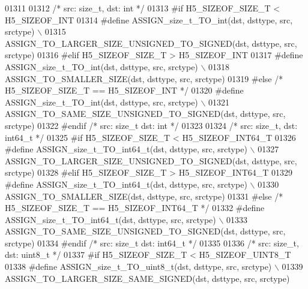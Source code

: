 \begin{DoxyCode}
01311 
01312 \textcolor{comment}{/* src: size\_t, dst: int */}
01313 \textcolor{preprocessor}{#if H5\_SIZEOF\_SIZE\_T < H5\_SIZEOF\_INT}
01314 \textcolor{preprocessor}{    #define ASSIGN\_size\_t\_TO\_int(dst, dsttype, src, srctype) \(\backslash\)}
01315 \textcolor{preprocessor}{        ASSIGN\_TO\_LARGER\_SIZE\_UNSIGNED\_TO\_SIGNED(dst, dsttype, src, srctype)}
01316 \textcolor{preprocessor}{#elif H5\_SIZEOF\_SIZE\_T > H5\_SIZEOF\_INT}
01317 \textcolor{preprocessor}{    #define ASSIGN\_size\_t\_TO\_int(dst, dsttype, src, srctype) \(\backslash\)}
01318 \textcolor{preprocessor}{        ASSIGN\_TO\_SMALLER\_SIZE(dst, dsttype, src, srctype)}
01319 \textcolor{preprocessor}{#else }\textcolor{comment}{/* H5\_SIZEOF\_SIZE\_T == H5\_SIZEOF\_INT */}\textcolor{preprocessor}{}
01320 \textcolor{preprocessor}{    #define ASSIGN\_size\_t\_TO\_int(dst, dsttype, src, srctype) \(\backslash\)}
01321 \textcolor{preprocessor}{        ASSIGN\_TO\_SAME\_SIZE\_UNSIGNED\_TO\_SIGNED(dst, dsttype, src, srctype)}
01322 \textcolor{preprocessor}{#endif }\textcolor{comment}{/* src: size\_t dst: int */}\textcolor{preprocessor}{}
01323 
01324 \textcolor{comment}{/* src: size\_t, dst: int64\_t */}
01325 \textcolor{preprocessor}{#if H5\_SIZEOF\_SIZE\_T < H5\_SIZEOF\_INT64\_T}
01326 \textcolor{preprocessor}{    #define ASSIGN\_size\_t\_TO\_int64\_t(dst, dsttype, src, srctype) \(\backslash\)}
01327 \textcolor{preprocessor}{        ASSIGN\_TO\_LARGER\_SIZE\_UNSIGNED\_TO\_SIGNED(dst, dsttype, src, srctype)}
01328 \textcolor{preprocessor}{#elif H5\_SIZEOF\_SIZE\_T > H5\_SIZEOF\_INT64\_T}
01329 \textcolor{preprocessor}{    #define ASSIGN\_size\_t\_TO\_int64\_t(dst, dsttype, src, srctype) \(\backslash\)}
01330 \textcolor{preprocessor}{        ASSIGN\_TO\_SMALLER\_SIZE(dst, dsttype, src, srctype)}
01331 \textcolor{preprocessor}{#else }\textcolor{comment}{/* H5\_SIZEOF\_SIZE\_T == H5\_SIZEOF\_INT64\_T */}\textcolor{preprocessor}{}
01332 \textcolor{preprocessor}{    #define ASSIGN\_size\_t\_TO\_int64\_t(dst, dsttype, src, srctype) \(\backslash\)}
01333 \textcolor{preprocessor}{        ASSIGN\_TO\_SAME\_SIZE\_UNSIGNED\_TO\_SIGNED(dst, dsttype, src, srctype)}
01334 \textcolor{preprocessor}{#endif }\textcolor{comment}{/* src: size\_t dst: int64\_t */}\textcolor{preprocessor}{}
01335 
01336 \textcolor{comment}{/* src: size\_t, dst: uint8\_t */}
01337 \textcolor{preprocessor}{#if H5\_SIZEOF\_SIZE\_T < H5\_SIZEOF\_UINT8\_T}
01338 \textcolor{preprocessor}{    #define ASSIGN\_size\_t\_TO\_uint8\_t(dst, dsttype, src, srctype) \(\backslash\)}
01339 \textcolor{preprocessor}{        ASSIGN\_TO\_LARGER\_SIZE\_SAME\_SIGNED(dst, dsttype, src, srctype)}

\end{DoxyCode}
